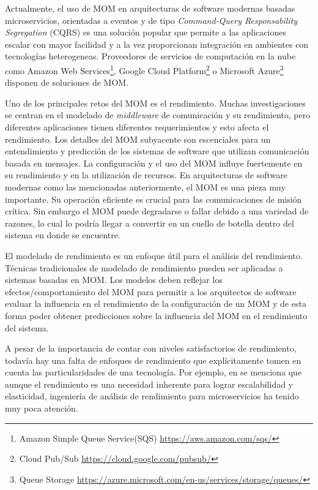 \documentclass[11pt, twoside]{report}
\begin{document}
Actualmente, el uso de MOM  en arquitecturas de software modernas basadas microservicios, orientadas a eventos y de tipo \emph{Command-Query Responsability Segregation} (CQRS) es una solución popular que permite a las aplicaciones escalar con mayor facilidad y a la vez proporcionan integración en ambientes con tecnologías heterogeneas. Proveedores de servicios de computación en la nube como Amazon Web Services\footnote{Amazon Simple Queue Service(SQS) \url{https://aws.amazon.com/sqs/}}, Google Cloud Platform\footnote{Cloud Pub/Sub \url{https://cloud.google.com/pubsub/}} o Microsoft Azure\footnote{Queue Storage \url{https://azure.microsoft.com/en-us/services/storage/queues/}} disponen de soluciones de MOM.

Uno de los principales retos del MOM es el rendimiento\cite{alwakeel}. Muchas investigaciones se centran en el modelado de \emph{middleware} de comunicación y su rendimiento, pero diferentes aplicaciones tienen diferentes requerimientos y esto afecta el rendimiento. Los detalles del MOM subyacente son escenciales para un entendimiento y predicción de los sistemas de software que utilizan comunicación basada en mensajes. La configuración y el uso del MOM influye fuertemente en su rendimiento y en la utilización de recursos. En arquitecturas de software modernas como las mencionadas anteriormente, el MOM es una pieza muy importante. Su operación eficiente es crucial para las comunicaciones de misión crítica. Sin embargo el MOM puede degradarse o fallar debido a una variedad de razones, lo cual lo podría llegar a convertir en un cuello de botella dentro del sistema en donde se encuentre\cite{chew}.

El modelado de rendimiento es un enfoque útil para el análisis del rendimiento. Técnicas tradicionales de modelado de rendimiento pueden ser aplicadas a sistemas basadas en MOM\cite{liu-gordon}. Los modelos deben reflejar los efectos/comportamiento del MOM para permitir a los arquitectos de software evaluar la influencia en el rendimiento de la configuración de un MOM y de esta forma poder obtener predicciones sobre la influencia del MOM en el rendimiento del sistema.


A pesar de la importancia de contar con niveles satisfactorios de rendimiento, todavía hay una falta de enfoques de rendimiento que explícitamente tomen en cuenta las particularidades de una tecnología. Por ejemplo, en \cite{microservices-challenges} se menciona que aunque el rendimiento es una necesidad inherente para lograr escalabilidad y elasticidad, ingeniería de análisis de rendimiento para microservicios ha tenido muy poca atención. 
\end{document}
